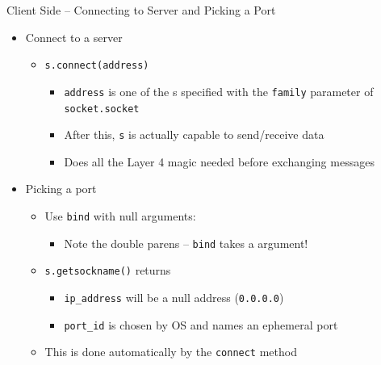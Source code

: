 \begin{frame}{Client Side -- Connecting to Server and Picking a Port}
%
\begin{itemize}
\item Connect to a server
	\begin{itemize}
	\item \texttt{s.connect(address)}
		\begin{itemize}
		\item \texttt{address} is one of the s specified with the \texttt{family} parameter of \texttt{socket.socket}
		\item After this, \texttt{s} is actually capable to send/receive data
		\item Does all the Layer 4 magic needed before exchanging messages
		\end{itemize}
	\end{itemize}
\pause
\item Picking a port
	\begin{itemize}
	\item Use \texttt{bind} with null arguments: 
		\begin{itemize}
		\item Note the double parens -- \texttt{bind} takes a  argument!
		\end{itemize}
	\item \texttt{s.getsockname()} returns 
		\begin{itemize}
		\item \texttt{ip\_address} will be a null address (\zB \texttt{0.0.0.0})
		\item \texttt{port\_id} is chosen by OS and names an ephemeral port
		\end{itemize}
	\item This is done automatically by the \texttt{connect} method
	\end{itemize}
\end{itemize}
%
\end{frame}



